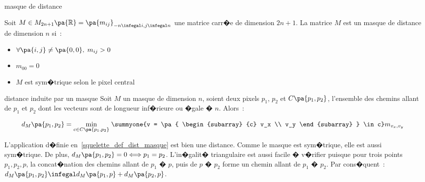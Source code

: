         \begin{xdefinition}{masque de distance}
        
        Soit $M \in M_{2n+1}\pa{\mathbb{R}} = \pa{m_{ij}}_{ -n \infegal i,j \infegal n}$ une matrice carr�e 
        de dimension $2n+1$. La matrice $M$ est un masque de distance de dimension $n$ si~:
        
                \begin{itemize}
                \item  $\forall \pa{i,j} \neq \pa{0,0}, \; m_{ij} > 0$
                \item  $m_{00} = 0$
                \item  $M$ est sym�trique selon le pixel central
                \end{itemize}
        
        \end{xdefinition}





            \begin{xdefinition}{distance induite par un masque}
            \label{squelette_def_dist_masque}
            Soit $M$ un masque de dimension $n$, soient deux pixels $p_1$, $p_2$ et $C\pa{p_1,p_2}$, 
            l'ensemble des chemins allant de $p_1$ et $p_2$ dont les vecteurs sont de longueur inf�rieure ou 
            �gale � $n$. Alors~:
            
                        $$
                        d_M\pa{p_1,p_2} = \underset{c \in C\pa{p_1,p_2}}{\min} \; \summyone{v = \pa{ \begin{subarray} {c}
                                    v_x \\ v_y \end{subarray} }
                                    \in c} m_{v_x, v_y}
                        $$
            
            \end{xdefinition}


L'application d�finie en~\ref{squelette_def_dist_masque} est bien une distance. Comme le masque est sym�trique, elle est aussi  sym�trique. De plus, $d_M\pa{p_1,p_2} = 0 \Longleftrightarrow p_1 = p_2$. L'in�galit� triangulaire est aussi facile � v�rifier puisque pour trois points $p_1,p_2,p$, la concat�nation des chemins allant de $p_1$ � $p$, puis de $p$ � $p_2$ forme un chemin allant de $p_1$ � $p_2$. Par cons�quent~: $d_M\pa{p_1,p_2} \infegal d_M\pa{p_1,p} + d_M\pa{p_2,p}$.

